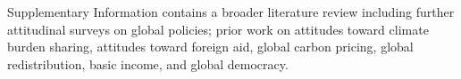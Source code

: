 Supplementary Information contains a broader literature review including further attitudinal surveys on global policies; prior work on attitudes toward climate burden sharing, attitudes toward foreign aid, global carbon pricing, global redistribution, basic income, and global democracy.



